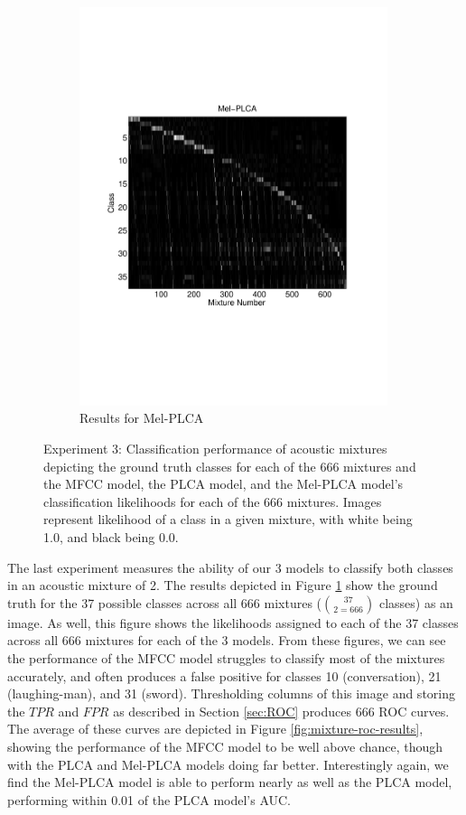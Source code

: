 \documentclass[a4paper,10pt,final]{ThesisStyle}
\begin{document}
\begin{figure}
\begin{subfigure}[b]{0.5\textwidth}
\includegraphics[width=0.99\textwidth]{images/mixture-melplca.pdf}
\caption{Results for Mel-PLCA}
\end{subfigure}%
\caption{Experiment 3: Classification performance of acoustic mixtures depicting the ground truth classes for each of the 666 mixtures and the MFCC model, the PLCA model, and the Mel-PLCA model's classification likelihoods for each of the 666 mixtures. Images represent likelihood of a class in a given mixture, with white being 1.0, and black being 0.0.}
\label{fig:mixture-images}
\end{figure}

The last experiment measures the ability of our 3 models to classify both classes in an acoustic mixture of 2.  The results depicted in Figure \ref{fig:mixture-images} show the ground truth for the 37 possible classes across all 666 mixtures ($37 \choose 2 = 666$ classes) as an image.  As well, this figure shows the likelihoods assigned to each of the 37 classes across all 666 mixtures for each of the 3 models.  From these figures, we can see the performance of the MFCC model struggles to classify most of the mixtures accurately, and often produces a false positive for classes 10 (conversation), 21 (laughing-man), and 31 (sword).  Thresholding columns of this image and storing the $TPR$ and $FPR$ as described in Section \ref{sec:ROC} produces 666 ROC curves.  The average of these curves are depicted in Figure \ref{fig:mixture-roc-results}, showing the performance of the MFCC model to be well above chance, though with the PLCA and Mel-PLCA models doing far better.  Interestingly again, we find the Mel-PLCA model is able to perform nearly as well as the PLCA model, performing within 0.01 of the PLCA model's AUC.  
\end{document}
